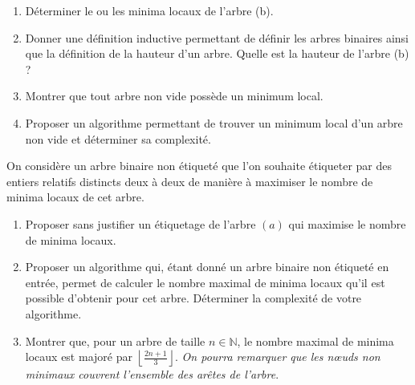 \documentclass[a4paper, 11pt]{article}
\begin{document}
\begin{figure}[h!]
\centering
{}
\hspace{1cm}
\end{figure}

\begin{enumerate}
\item Déterminer le ou les minima locaux de l'arbre (b).
\item Donner une définition inductive permettant de définir les arbres
  binaires ainsi que la définition de la hauteur d'un arbre. Quelle
  est la hauteur de l'arbre (b) ?
\item Montrer que tout arbre non vide possède un minimum local.
\item Proposer un algorithme permettant de trouver un minimum local
  d'un arbre non vide et déterminer sa complexité.
\end{enumerate}

On considère un arbre binaire non étiqueté que l'on souhaite étiqueter
par des entiers relatifs distincts deux à deux de manière à maximiser
le nombre de minima locaux de cet arbre.

\begin{enumerate}[resume]
\item Proposer sans justifier un étiquetage de l'arbre $(a)$ qui
  maximise le nombre de minima locaux.
\item Proposer un algorithme qui, étant donné un arbre binaire non
  étiqueté en entrée, permet de calculer le nombre maximal de minima
  locaux qu'il est possible d'obtenir pour cet arbre. Déterminer la
  complexité de votre algorithme.
\item Montrer que, pour un arbre de taille $n \in \mathbb{N}$, le nombre
  maximal de minima locaux est majoré par $\displaystyle \left\lfloor
  \frac{2n + 1}{3} \right\rfloor$. \emph{On pourra remarquer que les
  n\oe{}uds non minimaux couvrent l'ensemble des arêtes de l'arbre}.
\end{enumerate}
\end{document}
